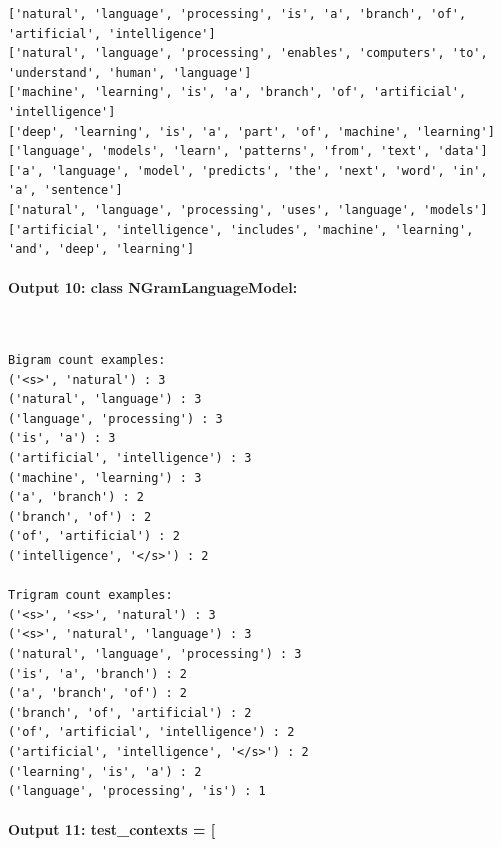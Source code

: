 \documentclass[12pt,a4paper,oneside]{report}
\begin{document}
\begin{Verbatim}[commandchars=\\\{\},breaklines=true,breakanywhere=true,fontsize=\scriptsize,frame=leftline,framesep=2mm,rulecolor=\color{gray}]
['natural', 'language', 'processing', 'is', 'a', 'branch', 'of', 'artificial', 'intelligence']
['natural', 'language', 'processing', 'enables', 'computers', 'to', 'understand', 'human', 'language']
['machine', 'learning', 'is', 'a', 'branch', 'of', 'artificial', 'intelligence']
['deep', 'learning', 'is', 'a', 'part', 'of', 'machine', 'learning']
['language', 'models', 'learn', 'patterns', 'from', 'text', 'data']
['a', 'language', 'model', 'predicts', 'the', 'next', 'word', 'in', 'a', 'sentence']
['natural', 'language', 'processing', 'uses', 'language', 'models']
['artificial', 'intelligence', 'includes', 'machine', 'learning', 'and', 'deep', 'learning']
\end{Verbatim}
\paragraph{Output 10: class NGramLanguageModel:}\mbox{}\\[-1ex]
\begin{Verbatim}[commandchars=\\\{\},breaklines=true,breakanywhere=true,fontsize=\scriptsize,frame=leftline,framesep=2mm,rulecolor=\color{gray}]
Bigram count examples:
('<s>', 'natural') : 3
('natural', 'language') : 3
('language', 'processing') : 3
('is', 'a') : 3
('artificial', 'intelligence') : 3
('machine', 'learning') : 3
('a', 'branch') : 2
('branch', 'of') : 2
('of', 'artificial') : 2
('intelligence', '</s>') : 2

Trigram count examples:
('<s>', '<s>', 'natural') : 3
('<s>', 'natural', 'language') : 3
('natural', 'language', 'processing') : 3
('is', 'a', 'branch') : 2
('a', 'branch', 'of') : 2
('branch', 'of', 'artificial') : 2
('of', 'artificial', 'intelligence') : 2
('artificial', 'intelligence', '</s>') : 2
('learning', 'is', 'a') : 2
('language', 'processing', 'is') : 1
\end{Verbatim}
\paragraph{Output 11: test\_contexts = [}\mbox{}\\[-1ex]
\end{document}
